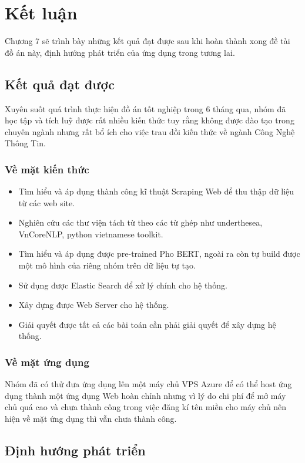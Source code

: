 \chapter{Kết luận}
\label{Chapter7}

Chương 7 sẽ trình bày những kết quả đạt được sau khi hoàn thành xong đề tài đồ án này, định hướng phát triển của ứng dụng trong tương lai.

\section{Kết quả đạt được}

Xuyên suốt quá trình thực hiện đồ án tốt nghiệp trong 6 tháng qua, nhóm đã học tập và tích luỹ được rất nhiều kiến thức tuy rằng không được đào tạo trong chuyên ngành nhưng rất bổ ích cho việc trau dồi kiến thức về ngành Công Nghệ Thông Tin.

\subsection{Về mặt kiến thức}
\begin{itemize}
	\item [-] Tìm hiểu và áp dụng thành công kĩ thuật Scraping Web để thu thập dữ liệu từ các web site.
	\item [-] Nghiên cứu các thư viện tách từ theo các từ ghép như underthesea, VnCoreNLP, python vietnamese toolkit.
	\item [-] Tìm hiểu và áp dụng được pre-trained Pho BERT, ngoài ra còn tự build được một mô hình của riêng nhóm trên dữ liệu tự tạo.
	\item [-] Sử dụng được Elastic Search để xử lý chính cho hệ thống.
	\item [-] Xây dựng được Web Server cho hệ thống.
	\item [-] Giải quyết được tất cả các bài toán cần phải giải quyết để xây dựng hệ thống.
\end{itemize}

\subsection{Về mặt ứng dụng}

Nhóm đã có thử đưa ứng dụng lên một máy chủ VPS Azure để có thể host ứng dụng thành một ứng dụng Web hoàn chỉnh nhưng vì lý do chi phí để mở máy chủ quá cao và chưa thành công trong việc đăng kí tên miền cho máy chủ nên hiện về mặt ứng dụng thì vẫn chưa thành công.
\section{Định hướng phát triển}

